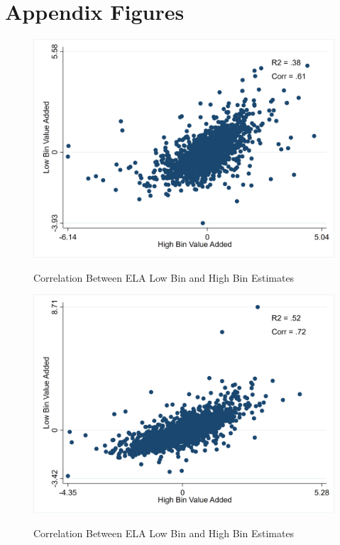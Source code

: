 \documentclass[letterpaper,12pt]{article}
\begin{document}
\appendix

\renewcommand\thefigure{\thesection.\arabic{figure}}
\setcounter{figure}{0}  

\section{Appendix Figures}\label{sec: Appendix Figures}

\begin{figure}[ht]
    \centering
    \caption{Correlation Between ELA Low Bin and High Bin Estimates}
    \includegraphics[width=\textwidth]{figures/ELA_High_Bin_Versus_Low_Bin.png}
    \label{fig: ELA corr}
\end{figure}

\begin{figure}[ht]
    \centering
    \caption{Correlation Between ELA Low Bin and High Bin Estimates}
    \includegraphics[width=\textwidth]{figures/Math_High_Bin_Versus_Low_Bin.png}
    \label{fig: math corr}
\end{figure}
\end{document}
